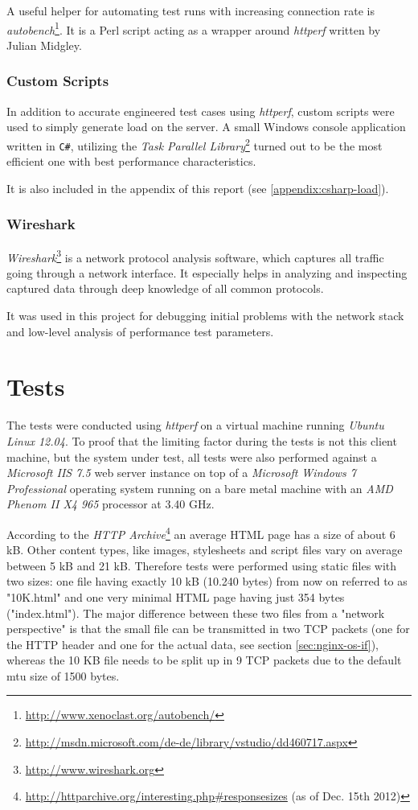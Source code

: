 A useful helper for automating test runs with increasing connection rate is \textit{autobench}\footnote{\url{http://www.xenoclast.org/autobench/}}. It is a Perl script acting as a wrapper around \textit{httperf} written by Julian Midgley.

\subsubsection{Custom Scripts}

In addition to accurate engineered test cases using \textit{httperf}, custom scripts were used to simply generate load on the server. A small Windows console application written in \texttt{C\#}, utilizing the \textit{Task Parallel Library}\footnote{\url{http://msdn.microsoft.com/de-de/library/vstudio/dd460717.aspx}} turned out to be the most efficient one with best performance characteristics.

It is also included in the appendix of this report (see \ref{appendix:csharp-load}).

\subsubsection{Wireshark}

\textit{Wireshark}\footnote{\url{http://www.wireshark.org}} is a network protocol analysis software, which captures all traffic going through a network interface. It especially helps in analyzing and inspecting captured data through deep knowledge of all common protocols.

It was used in this project for debugging initial problems with the network stack and low-level analysis of performance  test parameters.


\section{Tests}

The tests were conducted using \textit{httperf} on a virtual machine running \textit{Ubuntu Linux 12.04}. To proof that the limiting factor during the tests is not this client machine, but the system under test, all tests were also performed against a \textit{Microsoft IIS 7.5} web server instance on top of a \textit{Microsoft Windows 7 Professional} operating system running on a bare metal machine with an \textit{AMD Phenom II X4 965} processor at 3.40 GHz.

According to the \textit{HTTP Archive}\footnote{\url{http://httparchive.org/interesting.php\#responsesizes} (as of Dec. 15th 2012)} an average HTML page has a size of about 6 kB. Other content types, like images, stylesheets and script files vary on average between 5 kB and 21 kB. Therefore tests were performed using static files with two sizes: one file having exactly 10 kB (10.240 bytes) from now on referred to as "10K.html" and one very minimal HTML page having just 354 bytes ("index.html"). The major difference between these two files from a "network perspective" is that the small file can be transmitted in two TCP packets (one for the HTTP header and one for the actual data, see section \ref{sec:nginx-os-if}), whereas the 10 KB file needs to be split up in 9 TCP packets due to the default \gls{mtu} size of 1500 bytes.


